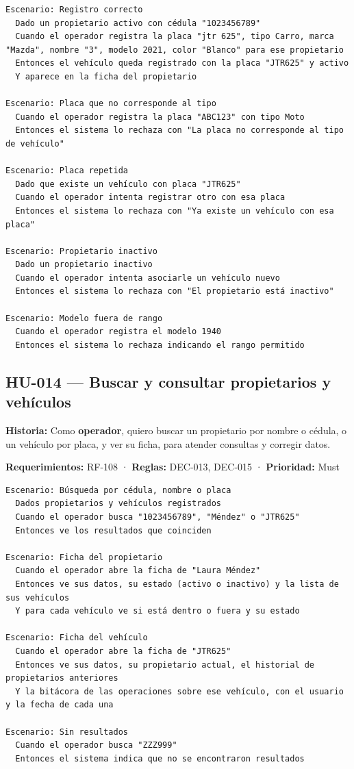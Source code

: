 \begin{lstlisting}[style=gherkin]
Escenario: Registro correcto
  Dado un propietario activo con cédula "1023456789"
  Cuando el operador registra la placa "jtr 625", tipo Carro, marca "Mazda", nombre "3", modelo 2021, color "Blanco" para ese propietario
  Entonces el vehículo queda registrado con la placa "JTR625" y activo
  Y aparece en la ficha del propietario

Escenario: Placa que no corresponde al tipo
  Cuando el operador registra la placa "ABC123" con tipo Moto
  Entonces el sistema lo rechaza con "La placa no corresponde al tipo de vehículo"

Escenario: Placa repetida
  Dado que existe un vehículo con placa "JTR625"
  Cuando el operador intenta registrar otro con esa placa
  Entonces el sistema lo rechaza con "Ya existe un vehículo con esa placa"

Escenario: Propietario inactivo
  Dado un propietario inactivo
  Cuando el operador intenta asociarle un vehículo nuevo
  Entonces el sistema lo rechaza con "El propietario está inactivo"

Escenario: Modelo fuera de rango
  Cuando el operador registra el modelo 1940
  Entonces el sistema lo rechaza indicando el rango permitido
\end{lstlisting}

\subsection{HU-014 — Buscar y consultar propietarios y vehículos}

\textbf{Historia:} Como \textbf{operador}, quiero buscar un propietario por nombre o cédula, o un vehículo por placa, y ver su ficha, para atender consultas y corregir datos.


\textbf{Requerimientos:} RF-108 · \textbf{Reglas:} DEC-013, DEC-015 · \textbf{Prioridad:} Must


\begin{lstlisting}[style=gherkin]
Escenario: Búsqueda por cédula, nombre o placa
  Dados propietarios y vehículos registrados
  Cuando el operador busca "1023456789", "Méndez" o "JTR625"
  Entonces ve los resultados que coinciden

Escenario: Ficha del propietario
  Cuando el operador abre la ficha de "Laura Méndez"
  Entonces ve sus datos, su estado (activo o inactivo) y la lista de sus vehículos
  Y para cada vehículo ve si está dentro o fuera y su estado

Escenario: Ficha del vehículo
  Cuando el operador abre la ficha de "JTR625"
  Entonces ve sus datos, su propietario actual, el historial de propietarios anteriores
  Y la bitácora de las operaciones sobre ese vehículo, con el usuario y la fecha de cada una

Escenario: Sin resultados
  Cuando el operador busca "ZZZ999"
  Entonces el sistema indica que no se encontraron resultados
\end{lstlisting}

